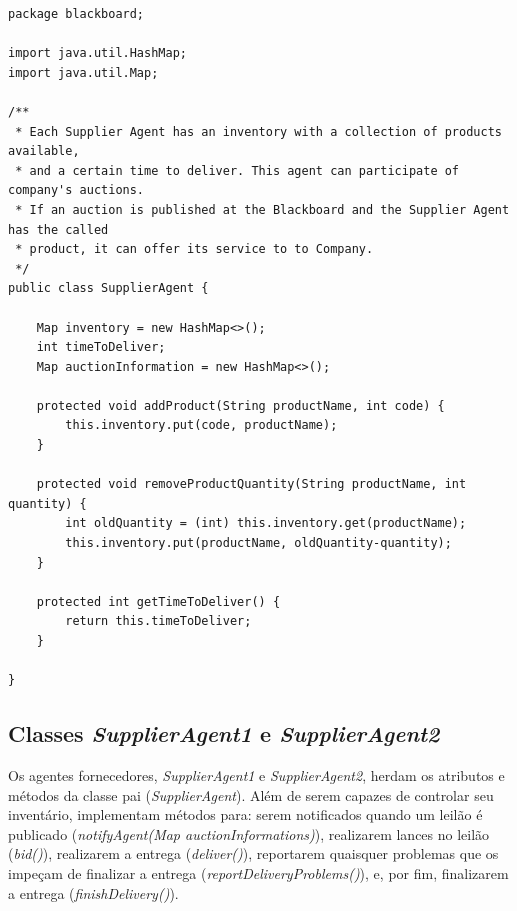\begin{lstlisting}
package blackboard;

import java.util.HashMap;
import java.util.Map;

/**
 * Each Supplier Agent has an inventory with a collection of products available,
 * and a certain time to deliver. This agent can participate of company's auctions.
 * If an auction is published at the Blackboard and the Supplier Agent has the called
 * product, it can offer its service to to Company.
 */
public class SupplierAgent {
	
	Map inventory = new HashMap<>();
	int timeToDeliver;
	Map auctionInformation = new HashMap<>();
			
	protected void addProduct(String productName, int code) {
		this.inventory.put(code, productName);
	}
	
	protected void removeProductQuantity(String productName, int quantity) {
		int oldQuantity = (int) this.inventory.get(productName);
		this.inventory.put(productName, oldQuantity-quantity);
	}
	
	protected int getTimeToDeliver() {
		return this.timeToDeliver;
	}

}
\end{lstlisting}
 
\subsection{Classes \textit{SupplierAgent1} e \textit{SupplierAgent2}}

Os agentes fornecedores, \textit{SupplierAgent1} e \textit{SupplierAgent2}, herdam os atributos e métodos da classe pai (\textit{SupplierAgent}). Além de serem capazes de controlar seu inventário, implementam métodos para: serem notificados quando um leilão é publicado (\textit{notifyAgent(Map auctionInformations)}), realizarem lances no leilão (\textit{bid()}), realizarem a entrega (\textit{deliver()}), reportarem quaisquer problemas que os impeçam de finalizar a entrega (\textit{reportDeliveryProblems()}), e, por fim, finalizarem a entrega (\textit{finishDelivery()}).

